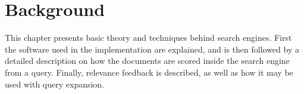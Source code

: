 \chapter{Background}
\label{ch:background}
This chapter presents basic theory and techniques behind search engines. First
the software used in the implementation are explained, and is then followed by a
detailed description on how the documents are scored inside the search engine from a
query. Finally, relevance feedback is described, as well as how it may be used with query
expansion.










